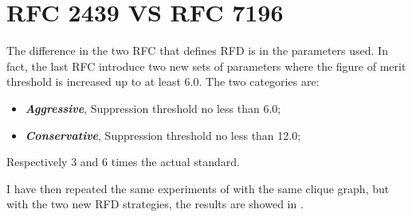 
\section{RFC 2439 VS RFC 7196}
\label{sec:bgp_rfd_comparison}

The difference in the two \ac{RFC} that defines \ac{RFD} \cite{rfc2439,rfc7196}
is in the parameters used.
In fact, the last \ac{RFC} introduce two new sets of parameters where the figure
of merit threshold is increased up to at least \num{6.0}.
The two categories are:
\begin{itemize}
	\item \textit{\textbf{Aggressive}}, Suppression threshold no less than \num{6.0};
	\item \textit{\textbf{Conservative}}, Suppression threshold no less than \num{12.0};
\end{itemize}

Respectively \num{3} and \num{6} times the actual standard.

I have then repeated the same experiments of  with the same
clique graph, but with the two new \ac{RFD} strategies, the results are 
showed in .

